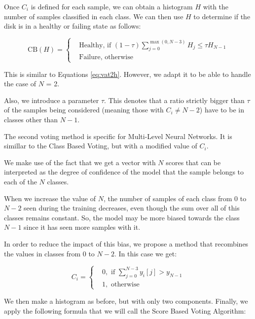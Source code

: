 Once $C_i$ is defined for each sample, we can obtain a histogram $H$ with the number of samples classified in each class.
We can then use $H$ to determine if the disk is in a healthy or failing state as follows:

\begin{equation}\label{eq:class_based_voting}
    \text{CB}(H) = 
    \begin{cases}
        &\text{Healthy, if } (1-\tau)\sum_{j=0}^{\max(0,N-3)}H_j \leq \tau H_{N-1} \\
        & \text{Failure, otherwise} 
  \end{cases}
\end{equation}

This is similar to Equations \ref{eq:vat2h}.
However, we adapt it to be able to handle the case of $N$ = 2.

Also, we introduce a parameter $\tau$.
This denotes that a ratio strictly bigger than $\tau$ of the samples being considered (meaning those with $C_i \neq N-2$) have to be in classes other than $N-1$.

The second voting method is specific for Multi-Level Neural Networks.
It is simillar to the Class Based Voting, but with a modified value of $C_i$.

We make use of the fact that we get a vector with $N$ scores that can be interpreted as the degree of confidence of the model that the sample belongs to each of the $N$ classes.

When we increase the value of $N$, the number of samples of each class from $0$ to $N-2$ seen during the training decreases, even though the sum over all of this classes remains constant.
So, the model may be more biased towards the class $N-1$ since it has seen more samples with it.

In order to reduce the impact of this bias, we propose a method that recombines the values in classes from $0$ to $N-2$.
In this case we get:

\begin{equation}\label{eq:modified_class}
  C_i = 
  \begin{cases}
    & 0, \text{ if } \sum_{j=0}^{N-3} y_i[j] > y_{N-1} \\
    & 1, \text{ otherwise}
  \end{cases}
\end{equation}

We then make a histogram as before, but with only two components.
Finally, we apply the following formula that we will call the Score Based Voting Algorithm:

